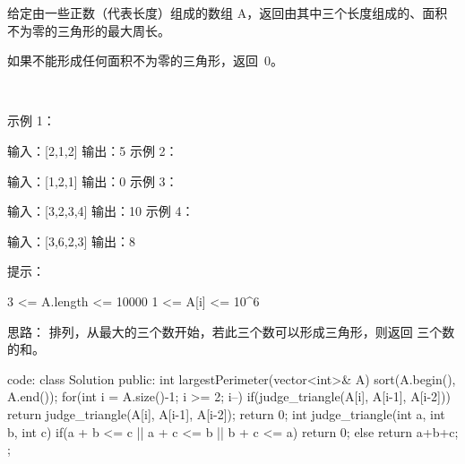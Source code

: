 给定由一些正数（代表长度）组成的数组 A，返回由其中三个长度组成的、面积不为零的三角形的最大周长。

如果不能形成任何面积不为零的三角形，返回 0。

 

示例 1：

输入：[2,1,2]
输出：5
示例 2：

输入：[1,2,1]
输出：0
示例 3：

输入：[3,2,3,4]
输出：10
示例 4：

输入：[3,6,2,3]
输出：8
 

提示：

3 <= A.length <= 10000
1 <= A[i] <= 10^6



























思路：
排列，从最大的三个数开始，若此三个数可以形成三角形，则返回 三个数的和。



























code:
class Solution {
public:
    int largestPerimeter(vector<int>& A) {
        sort(A.begin(), A.end());
        for(int i = A.size()-1; i >= 2; i--)
        {
            if(judge_triangle(A[i], A[i-1], A[i-2]))
                return judge_triangle(A[i], A[i-1], A[i-2]);
        }
        return 0;
    }
    int judge_triangle(int a, int b, int c)
    {
        if(a + b <= c || a + c <= b || b + c <= a)
            return 0;
        else return a+b+c;
    }
};